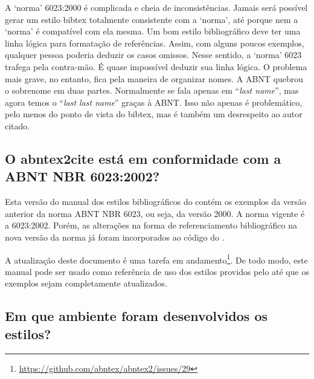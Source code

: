 \documentclass[a4paper]{ltxdoc}
\begin{document}
A `norma' 6023:2000 \cite{NBR6023:2000} é complicada e cheia de inconsistências.
Jamais será possível gerar um estilo \textsf{bibtex} totalmente consistente com
a `norma', até porque nem a `norma' é compatível com ela mesma. Um bom estilo bibliográfico
deve ter uma linha lógica para formatação de referências. Assim, com alguns
poucos exemplos, qualquer pessoa poderia deduzir os casos omissos. Nesse
sentido, a `norma' 6023 trafega pela contra-mão. É quase impossível deduzir sua
linha lógica. O problema mais grave, no entanto, fica pela maneira de organizar
nomes. A ABNT quebrou o sobrenome em duas partes. Normalmente se fala apenas em
``\textit{last name}'', mas agora temos o ``\textit{last last name}'' graças à
ABNT. Isso não apenas é problemático, pelo menos do ponto de vista do
\textsf{bibtex}, mas é também um desrespeito ao autor citado.


\subsection{O \textsf{abntex2cite} está em conformidade com a ABNT NBR
6023:2002?}
\label{sec-intro-compatibidade-6023-2002}

Esta versão do manual dos estilos bibliográficos do  contém os exemplos
da versão anterior da norma ABNT NBR 6023, ou seja, da versão 2000. A norma
vigente é a 6023:2002. Porém, as alterações na forma de referenciamento
bibliográfico na nova versão da norma já foram incorporados ao código do
.

A atualização deste documento é uma tarefa em
andamento\footnote{\url{https://github.com/abntex/abntex2/issues/29}}.
De todo modo, este manual pode ser usado como referência de uso dos estilos
providos pelo  até que os exemplos sejam completamente atualizados.

\subsection{Em que ambiente foram desenvolvidos os estilos?}
\end{document}
